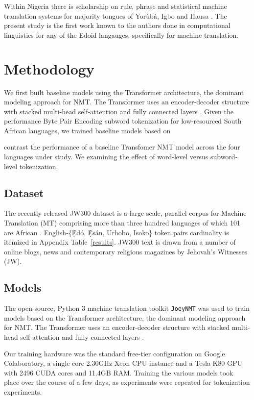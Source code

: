 \documentclass{article} %
\begin{document}
Within Nigeria there is scholarship on rule, phrase and statistical machine translation systems for majority tongues of Yor{\`u}b{\'a}, Igbo and Hausa \citep{odojelanguage}. The present study is the first work known to the authors done in computational linguistics for any of the Edoid langauges, specifically for machine translation.


\section{Methodology}
\label{methods}

We first built baseline models using the Transformer architecture, the dominant modeling approach for NMT. The Transformer uses an encoder-decoder structure with stacked multi-head self-attention and fully connected layers \citep{NIPS2017_7181}. Given the performance Byte Pair Encoding subword tokenization for low-resourced South African languages, we trained baseline models based on 

 contrast the performance of a baseline Transfomer NMT model across the four languages under study. We examining the effect of word-level versus subword-level tokenization.

\subsection{Dataset}
The recently released JW300 dataset is a large-scale, parallel corpus for Machine Translation (MT) comprising more than three hundred languages of which 101 are African \citep{agic-vulic-2019-jw300}. English-\{\d{\`E}d{\'o}, \d{\`E}s{\'a}n, Urhobo, Isoko\} token pairs cardinality is itemized in Appendix Table~\ref{results}. JW300 text is drawn from a number of online blogs, news and contemporary religious magazines by Jehovah's Witnesses (JW).

\subsection{Models}
The open-source, Python 3 machine translation toolkit \texttt{JoeyNMT} was used to train models based on the Transformer architecture, the dominant modeling approach for NMT. The Transformer uses an encoder-decoder structure with stacked multi-head self-attention and fully connected layers \citep{JoeyNMT, NIPS2017_7181}. 

Our training hardware was the standard free-tier configuration on Google Colaboratory, a single core 2.30GHz Xeon CPU instance and a Tesla K80 GPU with 2496 CUDA cores and 11.4GB RAM. Training the various models took place over the course of a few days, as experiments were repeated for tokenization experiments.
\end{document}
